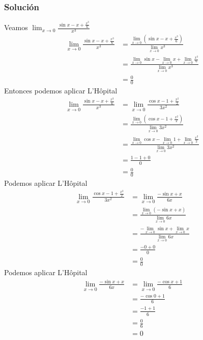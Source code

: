 \documentclass[a4paper]{article}
\begin{document}
\subsubsection*{Solución}
Veamos \(\displaystyle \lim_{x \to 0} \frac{\sin{x} - x + \frac{x^3}{6}}{x^3}\)
\begin{align*}
    \lim_{x \to 0} \frac{\sin{x} - x + \frac{x^3}{6}}{x^3} &= \frac{\displaystyle{\lim_{x \to 0}} \left(\sin{x} - x + \frac{x^3}{6}\right)}{\displaystyle{\lim_{x \to 0}}x^3} \\
    &= \frac{\displaystyle{\lim_{x \to 0}} \sin{x} - \displaystyle{\lim_{x \to 0}} x + \displaystyle{\lim_{x \to 0}}\frac{x^3}{6}}{\displaystyle{\lim_{x \to 0}}x^3} \\
    &= \frac{0}{0}
\end{align*}
Entonces podemos aplicar L'Hôpital
\begin{align*}
    \lim_{x \to 0} \frac{\sin{x} - x + \frac{x^3}{6}}{x^3} &= \lim_{x \to 0} \frac{\cos{x} - 1 + \frac{x^2}{2}}{3x^2} \\
    &= \frac{\displaystyle{\lim_{x \to 0}} \left(\cos{x} - 1 + \frac{x^2}{2}\right)}{\displaystyle{\lim_{x \to 0}} 3x^2} \\
    &= \frac{\displaystyle{\lim_{x \to 0}} \cos{x} - \displaystyle{\lim_{x \to 0}} 1 + \displaystyle{\lim_{x \to 0}} \frac{x^2}{2}}{\displaystyle{\lim_{x \to 0}} 3x^2} \\
    &= \frac{1 - 1 + 0}{0} \\
    &= \frac{0}{0}
\end{align*}
Podemos aplicar L'Hôpital
\begin{align*}
    \lim_{x \to 0} \frac{\cos{x} - 1 + \frac{x^2}{2}}{3x^2} &= \lim_{x \to 0} \frac{-\sin{x} + x}{6x} \\
    &= \frac{\displaystyle{\lim_{x \to 0}} \left(-\sin{x} + x\right)}{\displaystyle{\lim_{x \to 0}} 6x} \\
    &= \frac{-\displaystyle{\lim_{x \to 0}} \sin{x} + \displaystyle{\lim_{x \to 0}} x}{\displaystyle{\lim_{x \to 0}} 6x} \\
    &= \frac{- 0 + 0}{\displaystyle{0}} \\
    &= \frac{0}{\displaystyle{0}}
\end{align*}
Podemos aplicar L'Hôpital
\begin{align*}
    \lim_{x \to 0} \frac{-\sin{x} + x}{6x} &= \lim_{x \to 0} \frac{-\cos{x} + 1}{6} \\
    &= \frac{-\cos{0} + 1}{6} \\
    &= \frac{-1 + 1}{6} \\
    &= \frac{0}{6} \\
    &= 0
\end{align*}
\end{document}
